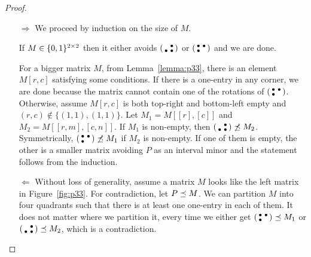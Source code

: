 \begin{proof}
\begin{itemize}
	\item[$\Rightarrow$] We proceed by induction on the size of $M$.

If $M\in\{0,1\}^{2\times2}$ then it either avoids $\left(\begin{smallmatrix} &\bullet\\\bullet&\bullet\end{smallmatrix}\right)$ or $\left(\begin{smallmatrix}\bullet&\bullet\\\bullet& \end{smallmatrix}\right)$ and we are done.

For a bigger matrix $M$, from Lemma~\ref{lemma:p33}, there is an element $M[r,c]$ satisfying some conditions. If there is a one-entry in any corner, we are done because the matrix cannot contain one of the rotations of $\left(\begin{smallmatrix}\bullet&\bullet\\\bullet& \end{smallmatrix}\right)$. Otherwise, assume $M[r,c]$ is both top-right and bottom-left empty and $(r,c)\not\in\{(1,1),(1,1)\}$. Let $M_1=M[[r],[c]]$ and $M_2=M[[r,m],[c,n]]$. If $M_1$ is non-empty, then $\left(\begin{smallmatrix} &\bullet\\\bullet&\bullet\end{smallmatrix}\right)\not\preceq M_2$. Symmetrically, $\left(\begin{smallmatrix}\bullet&\bullet\\\bullet& \end{smallmatrix}\right)\not\preceq M_1$ if $M_2$ is non-empty. If one of them is empty, the other is a smaller matrix avoiding $P$ as an interval minor and the statement follows from the induction.
	\item[$\Leftarrow$] Without loss of generality, assume a matrix $M$ looks like the left matrix in Figure~\ref{fig:p33}. For contradiction, let $P\preceq M$. We can partition $M$ into four quadrants such that there is at least one one-entry in each of them. It does not matter where we partition it, every time we either get $\left(\begin{smallmatrix}\bullet&\bullet\\\bullet& \end{smallmatrix}\right)\preceq M_1$ or $\left(\begin{smallmatrix} &\bullet\\\bullet&\bullet\end{smallmatrix}\right)\preceq M_2$, which is a contradiction.
\end{itemize}
\end{proof}

